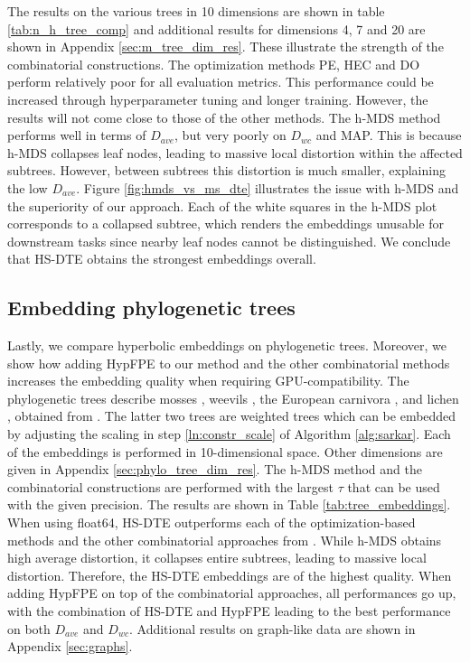 

The results on the various trees in 10 dimensions are shown in table \ref{tab:n_h_tree_comp} and additional results for dimensions 4, 7 and 20 are shown in Appendix \ref{sec:m_tree_dim_res}. These illustrate the strength of the combinatorial constructions. The optimization methods PE, HEC and DO perform relatively poor for all evaluation metrics. This performance could be increased through hyperparameter tuning and longer training. However, the results will not come close to those of the other methods. The h-MDS method performs well in terms of $D_{ave}$, but very poorly on $D_{wc}$ and MAP. This is because h-MDS collapses leaf nodes, leading to massive local distortion within the affected subtrees. However, between subtrees this distortion is much smaller, explaining the low $D_{ave}$. Figure \ref{fig:hmds_vs_ms_dte} illustrates the issue with h-MDS and the superiority of our approach.
Each of the white squares in the h-MDS plot corresponds to a collapsed subtree, which renders the embeddings unusable for downstream tasks since nearby leaf nodes cannot be distinguished.
We conclude that HS-DTE obtains the strongest embeddings overall.

\vspace{-0.2cm}




\subsection{Embedding phylogenetic trees}
\vspace{-0.2cm}
Lastly, we compare hyperbolic embeddings on phylogenetic trees. Moreover, we show how adding HypFPE to our method and the other combinatorial methods increases the embedding quality when requiring GPU-compatibility. The phylogenetic trees describe mosses \citep{hofbauer2016preliminary}, weevils \citep{marvaldi2002molecular}, the European carnivora \citep{roquet2014one}, and lichen \citep{zhao2016towards}, obtained from \citep{mctavish2015phylesystem}. The latter two trees are weighted trees which can be embedded by adjusting the scaling in step \ref{ln:constr_scale} of Algorithm \ref{alg:sarkar}. Each of the embeddings is performed in 10-dimensional space. Other dimensions are given in Appendix \ref{sec:phylo_tree_dim_res}. The h-MDS method and the combinatorial constructions are performed with the largest $\tau$ that can be used with the given precision. 
The results are shown in Table \ref{tab:tree_embeddings}. When using float64, HS-DTE outperforms each of the optimization-based methods and the other combinatorial approaches from \citep{sala2018representation}. While h-MDS obtains high average distortion, it collapses entire subtrees, leading to massive local distortion. Therefore, the HS-DTE embeddings are of the highest quality. When adding HypFPE on top of the combinatorial approaches, all performances go up, with the combination of HS-DTE and HypFPE leading to the best performance on both $D_{ave}$ and $D_{wc}$. Additional results on graph-like data are shown in Appendix \ref{sec:graphs}.
